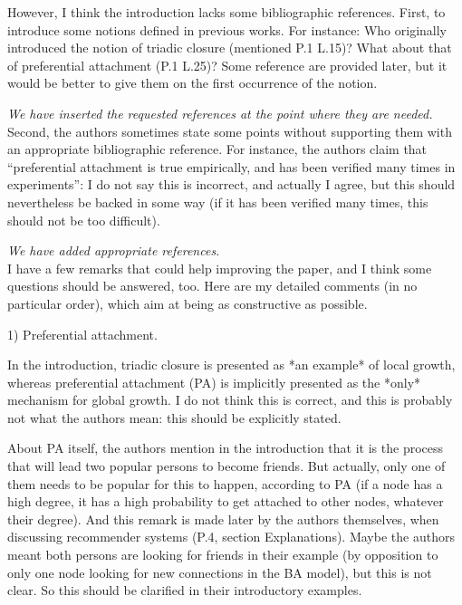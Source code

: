 \documentclass{article}
\begin{document}
However, I think the introduction lacks some bibliographic
references. First, to introduce some notions defined in previous
works. For instance: Who originally introduced the notion of triadic
closure (mentioned P.1 L.15)? What about that of preferential attachment
(P.1 L.25)? Some reference are provided later, but it would be better to
give them on the first occurrence of the notion. 

\textit{We have inserted the requested references at the point where
  they are needed.} \\

Second, the authors sometimes state some points without supporting them
with an appropriate bibliographic reference. For instance, the authors
claim that ``preferential attachment is true empirically, and has been
verified many times in experiments'': I do not say this is incorrect, and
actually I agree, but this should nevertheless be backed in some way (if
it has been verified many times, this should not be too difficult).  

\textit{We have added appropriate references.} \\

I have a few remarks that could help improving the paper, and I think
some questions should be answered, too. Here are my detailed comments
(in no particular order), which aim at being as constructive as
possible. 

1) Preferential attachment.

In the introduction, triadic closure is presented as *an example* of
local growth, whereas preferential attachment (PA) is implicitly
presented as the *only* mechanism for global growth. I do not think this
is correct, and this is probably not what the authors mean: this should
be explicitly stated. 

About PA itself, the authors mention in the introduction that it is the
process that will lead two popular persons to become friends. But
actually, only one of them needs to be popular for this to happen,
according to PA (if a node has a high degree, it has a high probability
to get attached to other nodes, whatever their degree). And this remark
is made later by the authors themselves, when discussing recommender
systems (P.4, section Explanations). Maybe the authors meant both
persons are looking for friends in their example (by opposition to only
one node looking for new connections in the BA model), but this is not
clear. So this should be clarified in their introductory examples. 
\end{document}
